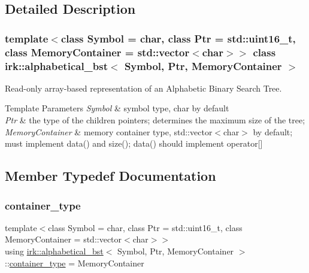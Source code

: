 \subsection{Detailed Description}
\subsubsection*{template$<$class Symbol = char, class Ptr = std\+::uint16\+\_\+t, class Memory\+Container = std\+::vector$<$char$>$$>$\newline
class irk\+::alphabetical\+\_\+bst$<$ Symbol, Ptr, Memory\+Container $>$}

Read-\/only array-\/based representation of an Alphabetic Binary Search Tree. 


\begin{DoxyTemplParams}{Template Parameters}
{\em Symbol} & symbol type, {\ttfamily char} by default \\
\hline
{\em Ptr} & the type of the children pointers; determines the maximum size of the tree; \\
\hline
{\em Memory\+Container} & memory container type, std\+::vector$<$char$>$ by default; must implement data() and size(); data() should implement operator\mbox{[}\mbox{]} \\
\hline
\end{DoxyTemplParams}


\subsection{Member Typedef Documentation}
\mbox{\label{classirk_1_1alphabetical__bst_aeed9efc6a48ff6d504a608e06223f386}} 
\subsubsection{\texorpdfstring{container\+\_\+type}{container\_type}}
{\footnotesize\ttfamily template$<$class Symbol = char, class Ptr = std\+::uint16\+\_\+t, class Memory\+Container = std\+::vector$<$char$>$$>$ \\
using \mbox{\hyperlink{classirk_1_1alphabetical__bst}{irk\+::alphabetical\+\_\+bst}}$<$ Symbol, Ptr, Memory\+Container $>$\+::\mbox{\hyperlink{classirk_1_1alphabetical__bst_aeed9efc6a48ff6d504a608e06223f386}{container\+\_\+type}} =  Memory\+Container}

